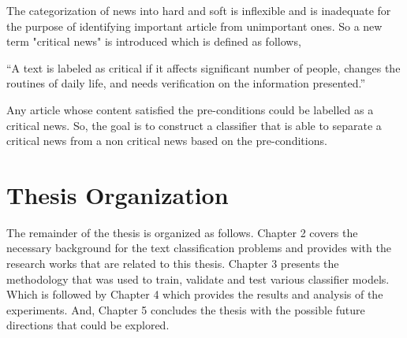 The categorization of news into hard and soft is inflexible and is inadequate for the purpose of identifying important article from unimportant ones. So a new term "critical news" is introduced which is defined as follows,

\enquote{A text is labeled as critical if it affects significant number of people, changes the routines of daily life, and needs verification on the information presented.}

Any article whose content satisfied the pre-conditions could be labelled as a critical news. So, the goal is to construct a classifier that is able to separate a critical news from a non critical news based on the pre-conditions.

\section{Thesis Organization} \label{intro:organization}
The remainder of the thesis is organized as follows. Chapter 2 covers the necessary background for the text classification problems and provides with the research works that are related to this thesis. Chapter 3 presents the methodology that was used to train, validate and test various classifier models. Which is followed by Chapter 4 which provides the results and analysis of the experiments. And, Chapter 5 concludes the thesis with the possible future directions that could be explored.